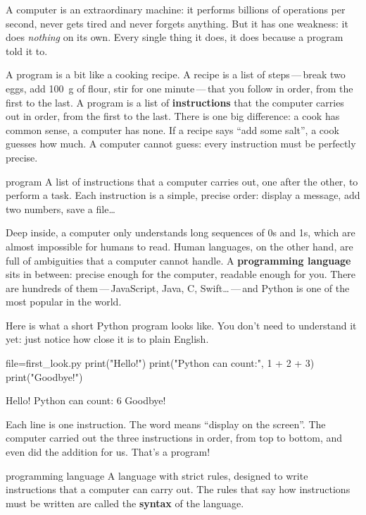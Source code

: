 A computer is an extraordinary machine: it performs billions of operations per second, never gets
tired and never forgets anything. But it has one weakness: it does \emph{nothing} on its own. Every
single thing it does, it does because a program told it to.\otPara

A program is a bit like a cooking recipe. A recipe is a list of steps\,---\,break two eggs, add
100~g of flour, stir for one minute\,---\,that you follow in order, from the first to the last. A
program is a list of \textbf{instructions} that the computer carries out in order, from the first to
the last. There is one big difference: a cook has common sense, a computer has none. If a recipe
says \enquote{add some salt}, a cook guesses how much. A computer cannot guess: every instruction must
be perfectly precise.

\begin{definition}{program}
A list of instructions that a computer carries out, one after the other, to perform a task. Each
instruction is a simple, precise order: display a message, add two numbers, save a file\ldots
\end{definition}

Deep inside, a computer only understands long sequences of 0s and 1s, which are almost impossible
for humans to read. Human languages, on the other hand, are full of ambiguities that a computer
cannot handle. A \textbf{programming language} sits in between: precise enough for the computer,
readable enough for you. There are hundreds of them\,---\,JavaScript, Java, C, Swift\ldots\,---\,and
Python is one of the most popular in the world.\otPara

Here is what a short Python program looks like. You don't need to understand it yet: just notice
how close it is to plain English.

\begin{code}{file=first_look.py}
print("Hello!")
print("Python can count:", 1 + 2 + 3)
print("Goodbye!")
\end{code}
\begin{sortie}
Hello!
Python can count: 6
Goodbye!
\end{sortie}

Each line is one instruction. The word  means \enquote{display on the screen}. The
computer carried out the three instructions in order, from top to bottom, and even did the
addition for us. That's a program!

\begin{definition}{programming language}
A language with strict rules, designed to write instructions that a computer can carry out. The
rules that say how instructions must be written are called the \textbf{syntax} of the language.
\end{definition}

